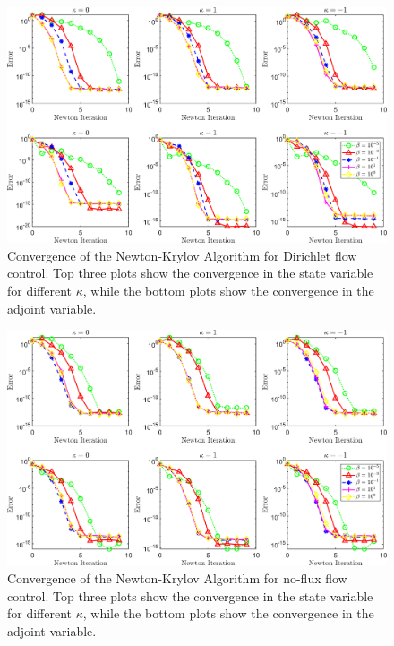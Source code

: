 \documentclass[11pt, a4paper]{article}
\theoremstyle{definition}
\begin{document}
\begin{figure}[h]
	\centering
	\includegraphics[scale=0.1]{FCDConvergence.png}
	\caption{Convergence of the Newton-Krylov Algorithm for Dirichlet flow control. Top three plots show the convergence in the state variable for different $\kappa$, while the bottom plots show the convergence in the adjoint variable.} 
	\label{Con3}
\end{figure}
\begin{figure}[h]
	\centering
	\includegraphics[scale=0.1]{FCNConvergence.png}
	\caption{Convergence of the Newton-Krylov Algorithm for no-flux flow control. Top three plots show the convergence in the state variable for different $\kappa$, while the bottom plots show the convergence in the adjoint variable.} 
	\label{Con4}
\end{figure}
\end{document}
